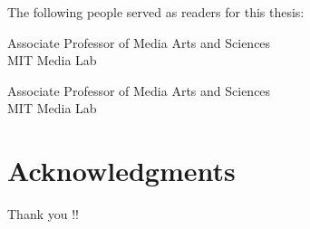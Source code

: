 %
%
%

\begin{titlepage}
\begin{large}
The following people served as readers for this thesis:

\signature{Sepandar Kamvar}{Associate Professor of Media Arts and Sciences \\
   MIT Media Lab}

\signature{Iyad Rahwan}{Associate Professor of Media Arts and Sciences \\
   MIT Media Lab}
 
\end{large}
\end{titlepage}
 
\cleardoublepage

\section*{Acknowledgments}

Thank you !!